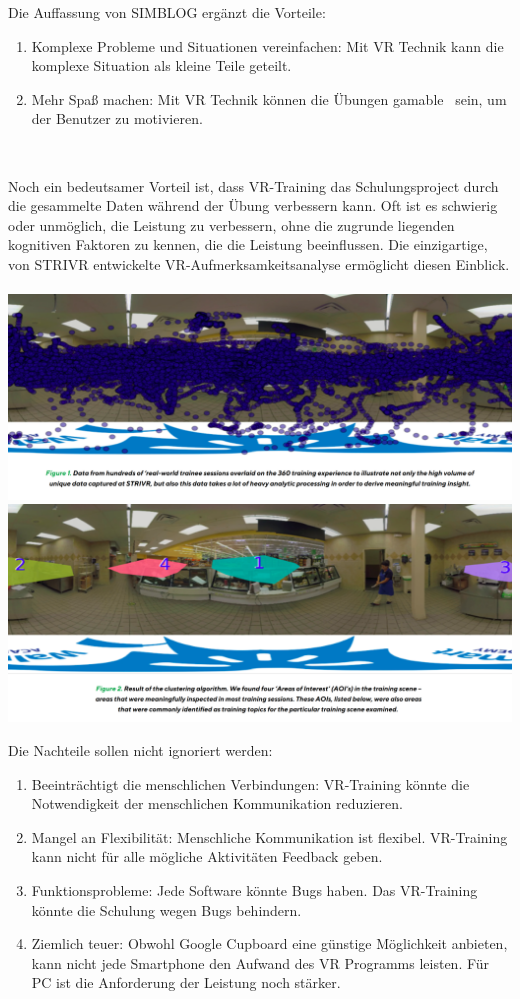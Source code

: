 Die Auffassung von SIMBLOG\citep{16} ergänzt die Vorteile:

\begin{enumerate}
\item Komplexe Probleme und Situationen vereinfachen: Mit VR Technik kann die komplexe Situation als kleine Teile geteilt.
\item Mehr Spaß machen: Mit VR Technik können die Übungen \glqq gamable \grqq\ sein, um der Benutzer zu motivieren. 
\end{enumerate}\

Noch ein bedeutsamer Vorteil ist, dass VR-Training das Schulungsproject durch die gesammelte Daten während der Übung verbessern kann. \glqq Oft ist es schwierig oder unmöglich, die Leistung zu verbessern, ohne die zugrunde liegenden kognitiven Faktoren zu kennen, die die Leistung beeinflussen. Die einzigartige, von STRIVR entwickelte VR-Aufmerksamkeitsanalyse ermöglicht diesen Einblick. \grqq\ \citep{18}
\includegraphics[width=\textwidth]{images/intentionanalys1.png}
\includegraphics[width=\textwidth]{images/intentionanalys2.png}

Die Nachteile sollen nicht ignoriert werden\citep{17}:

\begin{enumerate}
\item Beeinträchtigt die menschlichen Verbindungen: VR-Training könnte die Notwendigkeit der menschlichen Kommunikation reduzieren.
\item Mangel an Flexibilität: Menschliche Kommunikation ist flexibel. VR-Training kann nicht für alle mögliche Aktivitäten Feedback geben.
\item Funktionsprobleme: Jede Software könnte Bugs haben. Das VR-Training könnte die Schulung wegen Bugs behindern.
\item Ziemlich teuer: Obwohl Google Cupboard eine günstige Möglichkeit anbieten, kann nicht jede Smartphone den Aufwand des VR Programms leisten. Für PC ist die Anforderung der Leistung noch stärker.
\end{enumerate}\


